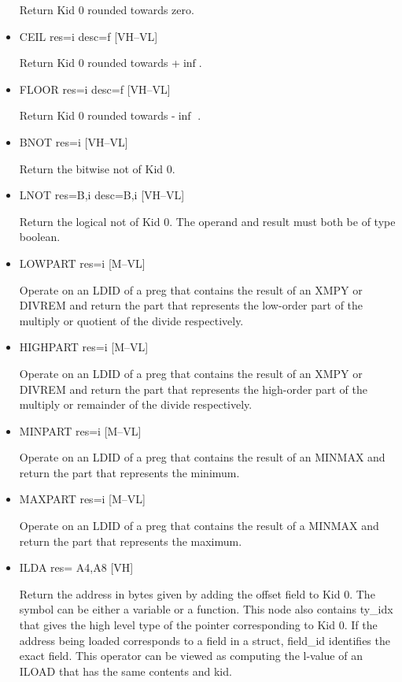 \documentclass{article}
\begin{document}
\begin{itemize}
Return Kid 0 rounded towards zero.

\item  CEIL res=i desc=f \hfill [VH--VL]

Return Kid 0 rounded towards +$\inf$.


\item  FLOOR res=i desc=f \hfill [VH--VL]

Return Kid 0 rounded towards -$\inf$ .

\item  BNOT res=i \hfill [VH--VL]

Return the bitwise not of Kid 0.

\item  LNOT res=B,i desc=B,i \hfill [VH--VL]

Return the logical not of Kid 0. The operand and result must both
be of type boolean.

\item  LOWPART res=i \hfill [M--VL]

Operate on an LDID of a preg that contains the result of an XMPY
or DIVREM and return the part that represents the low-order part
of the multiply or quotient of the divide respectively.

\item  HIGHPART res=i \hfill [M--VL]

Operate on an LDID of a preg that contains the result of an XMPY
or DIVREM and return the part that represents the high-order part
of the multiply or remainder of the divide respectively.

\item  MINPART res=i \hfill [M--VL]

Operate on an LDID of a preg that contains the result of an MINMAX
and return the part that represents the minimum.

\item  MAXPART res=i \hfill [M--VL]

Operate on an LDID of a preg that contains the result of a MINMAX
and return the part that represents the maximum.

\item  ILDA res= A4,A8 \hfill [VH]

Return the address in bytes given by adding the offset field to
Kid 0. The symbol can be either a variable or a function. This node
also contains
ty\_idx that gives the high level type of the pointer corresponding
to Kid 0. If the address being loaded corresponds to a field in a
struct, field\_id identifies the exact field. This operator can be
viewed as computing the l-value of an
ILOAD that has the same contents and kid.


\end{itemize}
\end{document}
